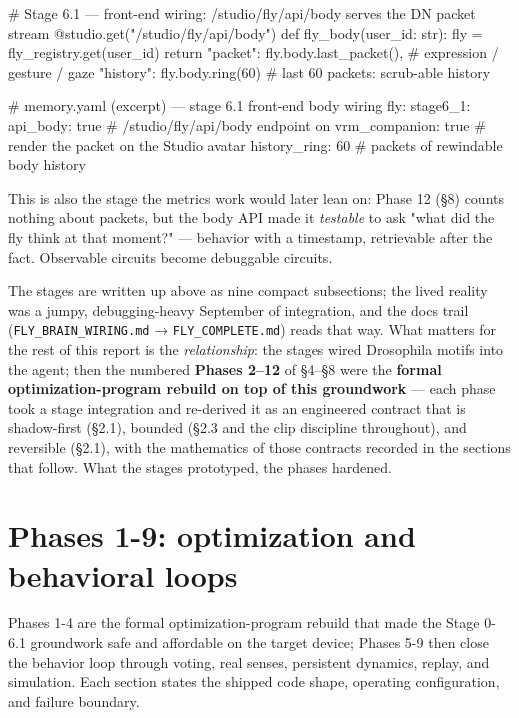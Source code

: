 \documentclass[11pt]{article}
\begin{document}
\begin{CodeBlock}
# Stage 6.1 — front-end wiring: /studio/fly/api/body serves the DN packet stream
@studio.get("/studio/fly/api/body")
def fly_body(user_id: str):
    fly = fly_registry.get(user_id)
    return {"packet": fly.body.last_packet(),   # expression / gesture / gaze
            "history": fly.body.ring(60)}       # last 60 packets: scrub-able history
\end{CodeBlock}

\begin{CodeBlock}
# memory.yaml (excerpt) — stage 6.1 front-end body wiring
fly:
  stage6_1:
    api_body: true               # /studio/fly/api/body endpoint on
    vrm_companion: true          # render the packet on the Studio avatar
    history_ring: 60             # packets of rewindable body history
\end{CodeBlock}

This is also the stage the metrics work would later lean on: Phase 12 (§8) counts nothing about packets, but the body API made it \emph{testable} to ask "what did the fly think at that moment?" — behavior with a timestamp, retrievable after the fact. Observable circuits become debuggable circuits.

The stages are written up above as nine compact subsections; the lived reality was a jumpy, debugging-heavy September of integration, and the docs trail (\texttt{FLY\_BRAIN\_WIRING.md} → \texttt{FLY\_COMPLETE.md}) reads that way. What matters for the rest of this report is the \emph{relationship}: the stages wired Drosophila motifs into the agent; then the numbered \textbf{Phases 2–12} of §4–§8 were the \textbf{formal optimization-program rebuild on top of this groundwork} — each phase took a stage integration and re-derived it as an engineered contract that is shadow-first (§2.1), bounded (§2.3 and the clip discipline throughout), and reversible (§2.1), with the mathematics of those contracts recorded in the sections that follow. What the stages prototyped, the phases hardened.

\section{Phases 1-9: optimization and behavioral loops}

Phases 1-4 are the formal optimization-program rebuild that made the Stage 0-6.1 groundwork safe and affordable on the target device; Phases 5-9 then close the behavior loop through voting, real senses, persistent dynamics, replay, and simulation. Each section states the shipped code shape, operating configuration, and failure boundary.
\end{document}
